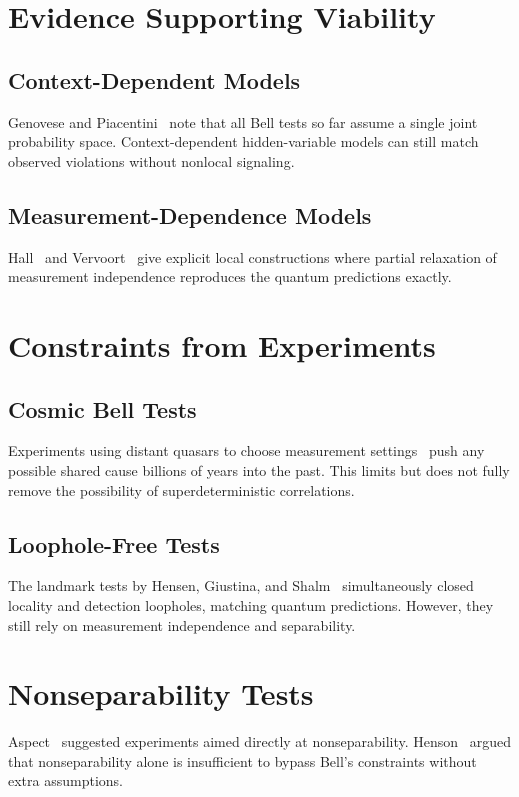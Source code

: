 \documentclass[twocolumn,aps,pre,floatfix,nofootinbib]{revtex4-2}
\begin{document}
\section{Evidence Supporting Viability}
\subsection{Context-Dependent Models}
Genovese and Piacentini~\cite{Genovese2025} note that all Bell tests so far assume a single joint probability space. Context-dependent hidden-variable models can still match observed violations without nonlocal signaling.

\subsection{Measurement-Dependence Models}
Hall~\cite{Hall2016} and Vervoort~\cite{Vervoort2013} give explicit local constructions where partial relaxation of measurement independence reproduces the quantum predictions exactly.

\section{Constraints from Experiments}
\subsection{Cosmic Bell Tests}
Experiments using distant quasars to choose measurement settings~\cite{Handsteiner2017} push any possible shared cause billions of years into the past. This limits but does not fully remove the possibility of superdeterministic correlations.

\subsection{Loophole-Free Tests}
The landmark tests by Hensen, Giustina, and Shalm~\cite{Hensen2015,Giustina2015,Shalm2015} simultaneously closed locality and detection loopholes, matching quantum predictions. However, they still rely on measurement independence and separability.

\section{Nonseparability Tests}
Aspect~\cite{Aspect1976} suggested experiments aimed directly at nonseparability. Henson~\cite{Henson2013} argued that nonseparability alone is insufficient to bypass Bell's constraints without extra assumptions.
\end{document}

